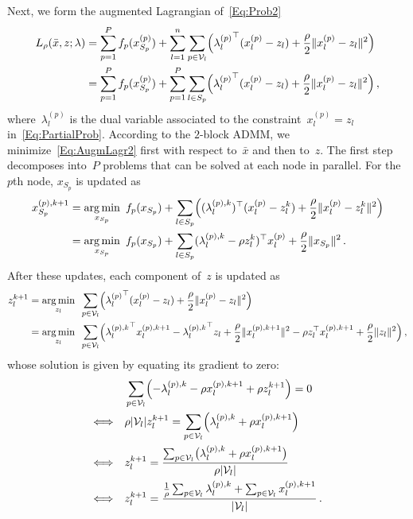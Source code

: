 \documentclass[letter,10pt]{article}
\theoremstyle{definition}
\theoremstyle{nonumberplain}
\begin{document}
	Next, we form the augmented Lagrangian of~\eqref{Eq:Prob2}
	\begin{align}
		  L_\rho(\bar{x},z;\lambda)
		&=
		  \sum_{p=1}^P f_p(x_{S_p}^{(p)}) + \sum_{l = 1}^n \sum_{p \in \mathcal{V}_l}
		    \Bigl(
					{\lambda_l^{(p)}}^\top (x_l^{(p)} - z_l) + \frac{\rho}{2}\|x_l^{(p)} - z_l\|^2
				\Bigr)
		\label{Eq:AugmLagr1}
		\\
		&=
		  \sum_{p=1}^P f_p(x_{S_p}^{(p)}) + \sum_{p = 1}^P \sum_{l \in S_p}
		    \Bigl(
					{\lambda_l^{(p)}}^\top (x_l^{(p)} - z_l) + \frac{\rho}{2}\|x_l^{(p)} - z_l\|^2
				\Bigr)\,,
		\label{Eq:AugmLagr2}
	\end{align}
	where~$\lambda_l^{(p)}$ is the dual variable associated to the constraint~$x_l^{(p)} = z_l$ in~\eqref{Eq:PartialProb}. According to the $2$-block ADMM, we minimize~\eqref{Eq:AugmLagr2} first with respect to~$\bar{x}$ and then to~$z$. The first step decomposes into~$P$ problems that can be solved at each node in parallel. For the $p$th node, $x_{S_p}$ is updated as
	\begin{align*}
		  x_{S_p}^{(p),k+1}
		&=
		  \underset{x_{S_p}}{\arg\min} \,\,\, f_p(x_{S_p}) + \sum_{l\in S_p} \Bigl((\lambda_l^{(p),k})^\top (x_l^{(p)} - z_l^k) + \frac{\rho}{2}\|x_l^{(p)} - z_l^k\|^2\Bigr)
		\\
		&=
		  \underset{x_{S_p}}{\arg\min} \,\,\, f_p(x_{S_p}) + \sum_{l\in S_p} (\lambda_l^{(p),k} - \rho z_l^k)^\top x_l^{(p)} + \frac{\rho}{2}\|x_{S_p}\|^2\,.
	\end{align*}
	After these updates, each component of~$z$ is updated as
	\begin{align*}
		  z_l^{k+1}
		&=
		  \underset{z_l}{\arg\min} \,\,\, \sum_{p \in \mathcal{V}_l} \Bigl( {\lambda_l^{(p)}}^\top (x_l^{(p)} - z_l) + \frac{\rho}{2}\|x_l^{(p)} - z_l\|^2 \Bigr)
		\\
		&=
		  \underset{z_l}{\arg\min} \,\,\, \sum_{p \in \mathcal{V}_l} \Bigl( {\lambda_l^{(p),k}}^\top x_l^{(p),k+1} - {\lambda_l^{(p),k}}^\top z_l + \frac{\rho}{2}\|x_l^{(p),k+1}\|^2 - \rho z_l^\top x_l^{(p),k+1}  + \frac{\rho}{2}\|z_l\|^2\Bigr)\,,
	\end{align*}
	whose solution is given by equating its gradient to zero:
	\begin{align}
		  &\sum_{p \in \mathcal{V}_l}\Bigl(-\lambda_l^{(p),k} - \rho x_l^{(p),k+1} + \rho z_l^{k+1}\Bigr) = 0
		\notag
		\\
		\Longleftrightarrow \quad &
		  \rho |\mathcal{V}_l|z_l^{k+1} = \sum_{p \in \mathcal{V}_l}\Bigl(\lambda_l^{(p),k} + \rho x_l^{(p),k+1}\Bigr)
		\notag
		\\
		\Longleftrightarrow \quad &
		  z_l^{k+1} = \frac{\sum_{p \in \mathcal{V}_l}\bigl(\lambda_l^{(p),k} + \rho x_l^{(p),k+1}\bigr)}{\rho |\mathcal{V}_l|}
		\notag
		\\
		\Longleftrightarrow \quad &
		  z_l^{k+1} = \frac{\frac{1}{\rho}\sum_{p \in \mathcal{V}_l}\lambda_l^{(p),k} + \sum_{p \in \mathcal{V}_l} x_l^{(p),k+1}}{ |\mathcal{V}_l|}\,.
		\label{Eq:UpdateZ_aux}
	\end{align}
\end{document}
